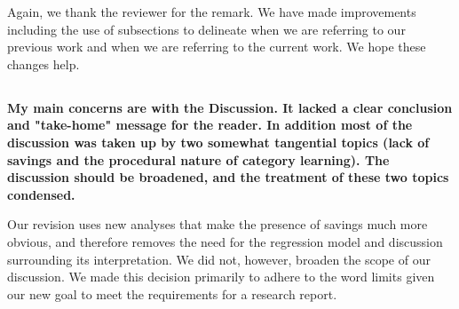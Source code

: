 \documentclass[10pt,a4paper]{article}
\begin{document}
Again, we thank the reviewer for the remark. We have made improvements including
the use of subsections to delineate when we are referring to our previous work
and when we are referring to the current work. We hope these changes help.

\subsection{} \textbf{
  My main concerns are with the Discussion. It lacked a clear conclusion and
  "take-home" message for the reader. In addition most of the discussion was taken
  up by two somewhat tangential topics (lack of savings and the procedural nature
  of category learning). The discussion should be broadened, and the treatment of
  these two topics condensed.
}

Our revision uses new analyses that make the presence of savings much more
obvious, and therefore removes the need for the regression model and discussion
surrounding its interpretation. We did not, however, broaden the scope of our
discussion. We made this decision primarily to adhere to the word limits given
our new goal to meet the requirements for a research report.


\end{document}
